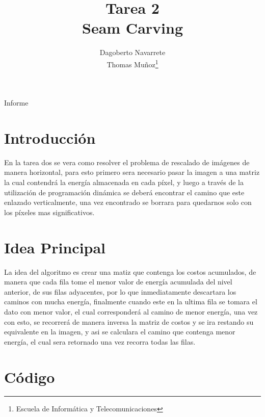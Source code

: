 \documentclass[twocolumn,11pts]{IEEEtran}
\begin{document}
\title{Tarea 2\\ Seam Carving}


\author{Dagoberto Navarrete\\Thomas Muñoz\thanks{Escuela de Informática y Telecomunicaciones}%
}

{Informe}
\maketitle
\section{Introducción}
En la tarea dos se vera como resolver el problema de rescalado de imágenes de manera horizontal, para esto primero sera necesario pasar la imagen a una matriz la cual contendrá la energía almacenada en cada píxel, y luego a través de la utilización de programación dinámica se deberá encontrar el camino que este enlazado verticalmente, una vez encontrado se borrara para quedarnos solo con los píxeles mas significativos.
\section{Idea Principal}
La idea del algoritmo es crear una matiz que contenga los costos acumulados, de manera que cada fila tome el menor valor de energía acumulada del nivel anterior, de sus filas adyacentes, por lo que inmediatamente descartara los caminos con mucha energía, finalmente cuando este en la ultima fila se tomara el dato con menor valor, el cual corresponderá  al camino de menor energía, una vez con esto, se recorrerá de manera inversa la matriz de costos y se ira restando su equivalente en la imagen, y asi se calculara el camino que contenga menor energía, el cual sera retornado una vez recorra todas las filas.

\section{Código}


\end{document}
